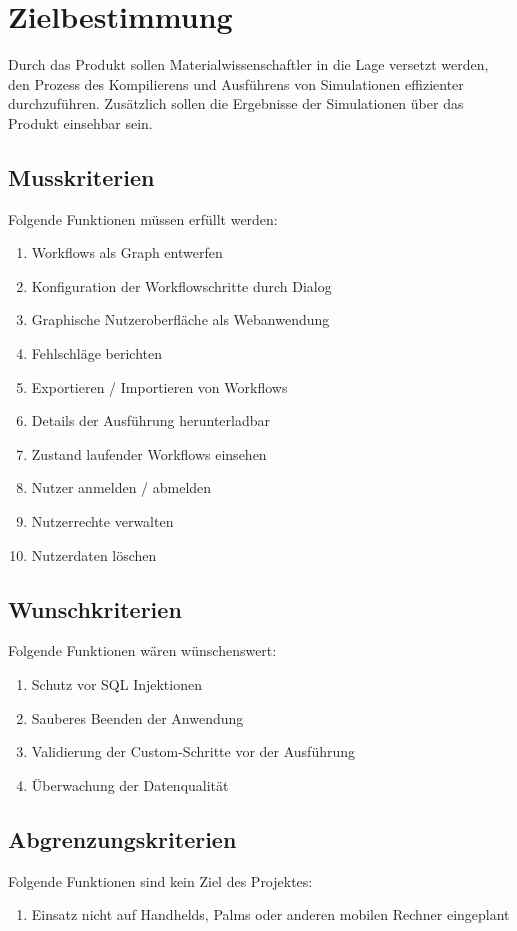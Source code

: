 \chapter{Zielbestimmung}
Durch das Produkt sollen Materialwissenschaftler in die Lage versetzt werden, den Prozess des Kompilierens und Ausführens von Simulationen effizienter durchzuführen. Zusätzlich sollen die Ergebnisse der Simulationen über das Produkt einsehbar sein. \newline
\section{Musskriterien}
Folgende Funktionen müssen erfüllt werden:
\renewcommand{\labelenumi}{/M\arabic{enumi}0/}
\begin{enumerate}
    \setlength\itemsep{-1em}
    \item Workflows als Graph entwerfen
    \item Konfiguration der Workflowschritte durch Dialog
    \item Graphische Nutzeroberfläche als Webanwendung
    \item Fehlschläge berichten
    \item Exportieren / Importieren von Workflows
    \item Details der Ausführung herunterladbar
    \item Zustand laufender Workflows einsehen
    \item Nutzer anmelden / abmelden
    \item Nutzerrechte verwalten
    \item Nutzerdaten löschen
\end{enumerate}
\newpage
\section{Wunschkriterien}
Folgende Funktionen wären wünschenswert:
\renewcommand{\labelenumi}{/W\arabic{enumi}0/}
\begin{enumerate}
    \setlength\itemsep{-1em}
    \item Schutz vor SQL Injektionen
    \item Sauberes Beenden der Anwendung
    \item Validierung der Custom-Schritte vor der Ausführung
    \item Überwachung der Datenqualität
\end{enumerate}

\section{Abgrenzungskriterien}
Folgende Funktionen sind kein Ziel des Projektes:
\renewcommand{\labelenumi}{/A\arabic{enumi}0/}
\begin{enumerate}
    \setlength\itemsep{-1em}
    \item Einsatz nicht auf Handhelds, Palms oder anderen mobilen Rechner eingeplant 
\end{enumerate}